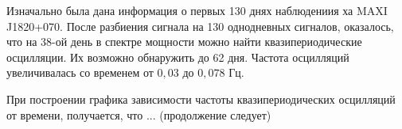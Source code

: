 	Изначально была дана информация о первых 130 днях наблюдениия ха MAXI J1820+070. После разбиения сигнала на 130 однодневных сигналов, оказалось, что на 38-ой день в спектре мощности можно найти квазипериодические осцилляции. Их возможно обнаружить до 62 дня. Частота осцилляций увеличивалась со временем от $0{,}03$ до $0{,}078$ Гц.
	
	При построении графика зависимости частоты квазипериодических осцилляций от времени, получается, что ... (продолжение следует)

